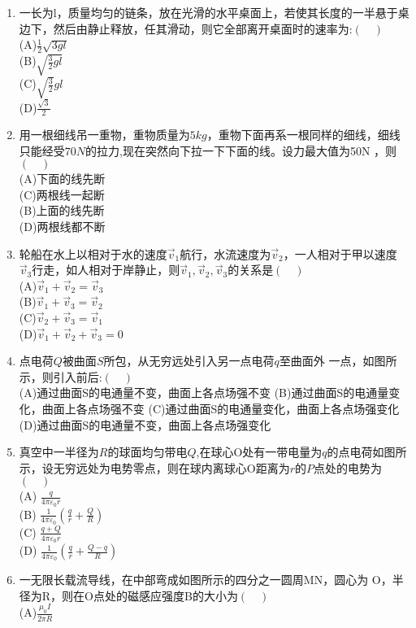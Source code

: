 \begin{enumerate}
\item 一长为l，质量均匀的链条，放在光滑的水平桌面上，若使其长度的一半悬于桌边下，然后由静止释放，任其滑动，则它全部离开桌面时的速率为:$(\quad)$\\
(A)$\frac{1}{2}\sqrt{3gl}$\\
(B)$\sqrt{\frac{3}{2}gl}$\\
(C)$\sqrt{\frac{3}{2}}gl$\\
(D)$\frac{\sqrt{3}}{2}$
\item 用一根细线吊一重物，重物质量为$5kg$，重物下面再系一根同样的细线，细线只能经受$70N$的拉力,现在突然向下拉一下下面的线。设力最大值为50N ，则$(\quad)$\\
(A)下面的线先断\\
(C)两根线一起断\\
(B)上面的线先断\\
(D)两根线都不断
\item 轮船在水上以相对于水的速度$\vec v_1$航行，水流速度为$\vec v_2$，一人相对于甲以速度$\vec v_3$行走，如人相对于岸静止，则$\vec v_1,\vec v_2,\vec v_3$的关系是$(\quad)$\\
(A)$\vec v_1+\vec v_2=\vec v_3$\\
(B)$\vec v_1+\vec v_3=\vec v_2$\\
(C)$\vec v_2+\vec v_3=\vec v_1$\\
(D)$\vec v_1+\vec v_2+\vec v_3=0$
\item 点电荷$Q$被曲面$S$所包，从无穷远处引入另一点电荷$q$至曲面外
一点，如图所示，则引入前后:$(\quad)$\\
(A)通过曲面S的电通量不变，曲面上各点场强不变
(B)通过曲面S的电通量变化，曲面上各点场强不变
(C)通过曲面S的电通量变化，曲面上各点场强变化
(D)通过曲面S的电通量不变，曲面上各点场强变化
\item 真空中一半径为$R$的球面均匀带电$Q$,在球心O处有一带电量为$q$的点电荷如图所示，设无穷远处为电势零点，则在球内离球心O距离为$r$的$P$点处的电势为$(\quad)$\\
(A) $\displaystyle \frac{q}{4\pi \varepsilon_0 r}$\\
(B) $\displaystyle \frac{1}{4\pi \varepsilon_0}(\frac{q}{r}+\frac{Q}{R})$\\
(C) $\displaystyle \frac{q+Q}{4\pi \varepsilon_0 r}$\\
(D) $\displaystyle\frac{1}{4\pi \varepsilon_0}(\frac{q}{r}+\frac{Q-q}{R})$
\item 一无限长载流导线，在中部弯成如图所示的四分之一圆周MN，圆心为 O，半径为R，则在O点处的磁感应强度B的大小为$(\quad)$\\
(A)$\displaystyle \frac{\mu_0 I}{2\pi R} $\\

\end{enumerate}
